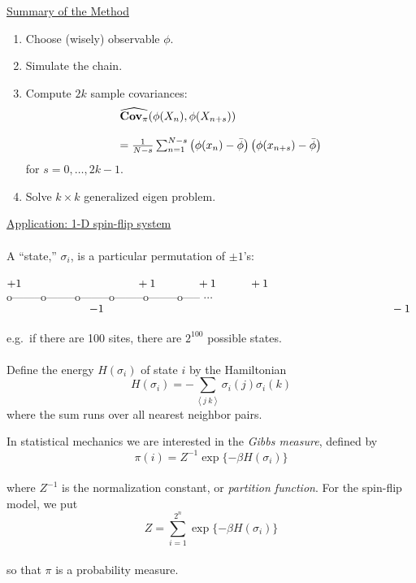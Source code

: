 \documentclass{slides}
\newcommand{\Cpi}{\mbox{{\bf Cov}}\ensuremath{_{\pi}}}
\begin{document}
\begin{slide}
\underline{Summary of the Method}
\begin{enumerate}
\item Choose (wisely) observable $\phi$.
\item Simulate the chain.
\item Compute $2k$ sample covariances:
\[\begin{array}{l}
\widehat{\Cpi}(\phi(X_n),\phi(X_{n+s}))\\
\\
= \frac{1}{N - s}\sum_{n=1}^{N - s}\left(\phi(x_n)- \bar \phi\right)
\left(\phi(x_{n+s})- \bar \phi\right)
\end{array}\]
for $s=0,\ldots,2k-1$.
\item Solve $k \times k$ generalized eigen problem.
\end{enumerate} 
\end{slide}
\begin{slide}
\underline{Application: 1-D spin-flip system}\\\\
A ``state,'' $\sigma_i$, is a particular permutation of $\pm 1$'s:\\\\
$+1\hspace{1.4 in} +1 \hspace{.5 in} +1 \hspace{.4 in} +1$\\
o--------o--------o--------o--------o--------o----- $\cdots$\\
\indent $\hspace{1 in} -1 \hspace{3.5 in} -1$
\\\\
e.g.~if there are 100 sites, there are $2^{100}$ possible states.
\\\\
Define the energy $H(\sigma_i)$ of state $i$ by the Hamiltonian
\[H(\sigma_i) = -\sum_{\left<j\:k\right>}\sigma_i(j)\sigma_i(k) \] 
where the sum runs over all nearest neighbor pairs.  
\end{slide}

\begin{slide}
In statistical mechanics we are interested in
the {\it Gibbs measure}, defined by
\\
\begin{equation}
\label{eqn:gibbs}
\pi(i) = Z^{-1}\exp\{-\beta H(\sigma_i)\}
\end{equation}
\\
where $Z^{-1}$ is the normalization constant, or \emph{partition
  function}.  For the spin-flip model, we put
\\
\[ Z = \sum_{i=1}^{2^n}\exp\{-\beta H(\sigma_i)\} \]
\\
so that $\pi$ is a probability measure.
\end{slide}
\end{document}
